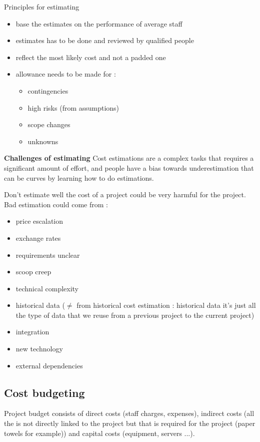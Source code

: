 \documentclass{article}
\begin{document}
Principles for estimating 
\begin{itemize}
	\item base the estimates on the performance of average staff
	\item estimates has to be done and reviewed by qualified people
	\item reflect the most likely cost and not a padded one
	\item allowance needs to be made for :
	\begin{itemize}
		\item contingencies
		\item high risks (from assumptions)
		\item scope changes
		\item unknowns
	\end{itemize} 
\end{itemize}


\textbf{Challenges of estimating}\newline
Cost estimations are a complex tasks that requires a significant amount of effort, and people have a bias towards underestimation that can be curves by learning how to do estimations.\newline

Don't estimate well the cost of a project could be very harmful for the project. Bad estimation could come from :
\begin{itemize}
	\item price escalation
	\item exchange rates
	\item requirements unclear
	\item scoop creep
	\item technical complexity
	\item historical data ($\neq$ from historical cost estimation : historical data it's just all the type of data that we reuse from a previous project to the current project)
	\item integration
	\item new technology
	\item external dependencies
\end{itemize}

\subsection{Cost budgeting}
Project budget consists of direct costs (staff charges, expenses), indirect costs (all the is not directly linked to the project but that is required for the project (paper towels for example)) and capital costs (equipment, servers ...).\newline
\newline
\end{document}

